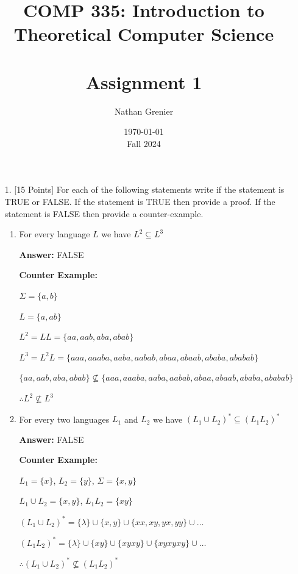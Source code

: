 \documentclass[12pt]{article}
\title{COMP 335: Introduction to Theoretical Computer Science\\
\ \\
Assignment 1}
\author{Nathan Grenier}
\date{\today \\ Fall 2024}
\begin{document}
\maketitle

\newpage

\begin{enumerate}

	\item[1.] [15 Points] For each of the following statements write if the statement is TRUE or FALSE. If the statement is TRUE then provide a proof. If the statement is FALSE then provide a counter-example.

	      \begin{enumerate}

		      \item For every language $L$ we have $L^2 \subseteq L^3$

		            \noindent \textbf{Answer:} FALSE

		            \noindent \textbf{Counter Example:}

		            $\Sigma = \{a,b \}$

		            $L=\{a, ab \}$

		            $L^2=LL=\{aa, aab, aba, abab \}$

		            $L^3=L^2L=\{aaa, aaaba, aaba, aabab, abaa, abaab, ababa, ababab \}$

		            $\{aa, aab, aba, abab \} \not\subseteq \{aaa, aaaba, aaba, aabab, abaa, abaab, ababa, ababab \}$

		            $\therefore L^2 \not\subseteq L^3$


		      \item For every two languages $L_1$ and $L_2$ we have $(L_1 \cup L_2)^* \subseteq (L_1L_2)^*$

		            \noindent \textbf{Answer:} FALSE

		            \noindent \textbf{Counter Example:}

		            $L_1 = \{x \}$, $L_2= \{y \}$, $\Sigma = \{x,y \}$

		            $L_1 \cup L_2 = \{x,y \}$, $L_1L_2 = \{xy \}$

		            $(L_1 \cup L_2)^* = \{\lambda \} \cup \{x,y \} \cup \{xx, xy, yx, yy \} \cup \dots$

		            $(L_1L_2)^* = \{\lambda \} \cup \{xy \} \cup \{xyxy \} \cup \{xyxyxy \} \cup \dots$

		            $\therefore (L_1 \cup L_2)^* \not\subseteq (L_1L_2)^*$


\end{enumerate}
\end{enumerate}
\end{document}
